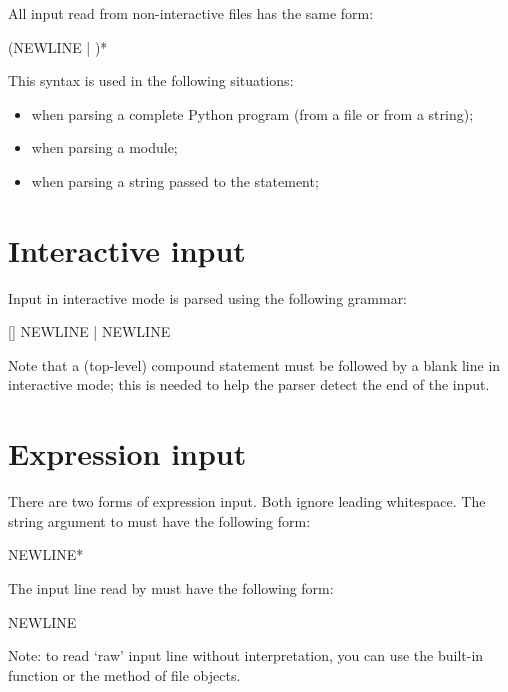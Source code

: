 All input read from non-interactive files has the same form:

\begin{productionlist}
             {(NEWLINE | )*}
\end{productionlist}

This syntax is used in the following situations:

\begin{itemize}

\item when parsing a complete Python program (from a file or from a string);

\item when parsing a module;

\item when parsing a string passed to the  statement;

\end{itemize}


\section{Interactive input\label{interactive}}

Input in interactive mode is parsed using the following grammar:

\begin{productionlist}
             {[] NEWLINE |  NEWLINE}
\end{productionlist}

Note that a (top-level) compound statement must be followed by a blank
line in interactive mode; this is needed to help the parser detect the
end of the input.


\section{Expression input\label{expression-input}}

There are two forms of expression input.  Both ignore leading
whitespace.
The string argument to  must have the following form:

\begin{productionlist}
             { NEWLINE*}
\end{productionlist}

The input line read by  must have the following form:

\begin{productionlist}
             { NEWLINE}
\end{productionlist}

Note: to read `raw' input line without interpretation, you can use the
built-in function  or the  method
of file objects.
